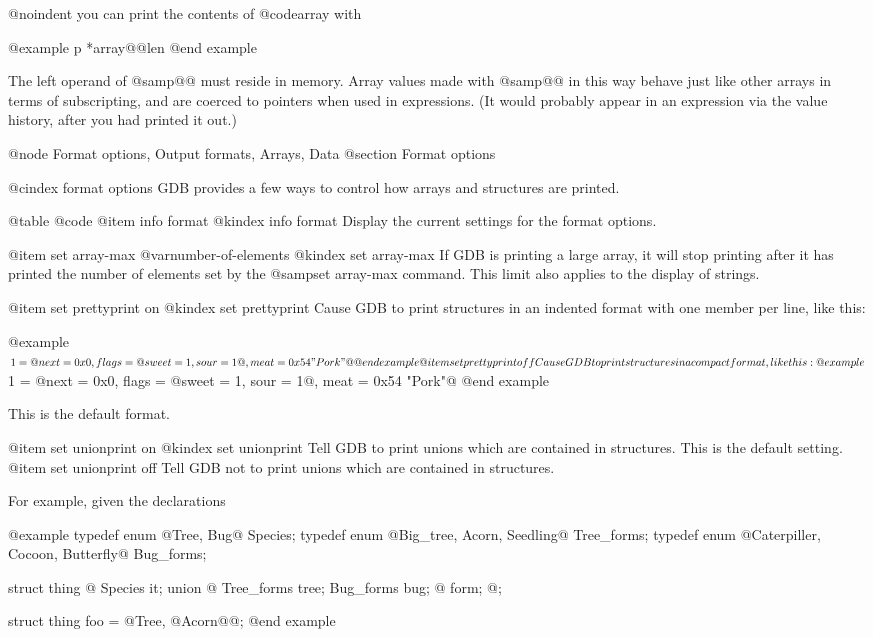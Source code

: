 @noindent
you can print the contents of @code{array} with

@example
p *array@@len
@end example

The left operand of @samp{@@} must reside in memory.  Array values made
with @samp{@@} in this way behave just like other arrays in terms of
subscripting, and are coerced to pointers when used in expressions.
(It would probably appear in an expression via the value history,
after you had printed it out.)

@node Format options, Output formats, Arrays, Data
@section Format options

@cindex format options
GDB provides a few ways to control how arrays and structures are
printed.  

@table @code
@item info format
@kindex info format
Display the current settings for the format options.

@item set array-max @var{number-of-elements}
@kindex set array-max
If GDB is printing a large array, it will stop printing after it has
printed the number of elements set by the @samp{set array-max} command.
This limit also applies to the display of strings.

@item set prettyprint on
@kindex set prettyprint
Cause GDB to print structures in an indented format with one member per
line, like this:

@example
$1 = @{
  next = 0x0,
  flags = @{
    sweet = 1,
    sour = 1
  @},
  meat = 0x54 "Pork"
@}
@end example

@item set prettyprint off
Cause GDB to print structures in a compact format, like this:

@example
$1 = @{next = 0x0, flags = @{sweet = 1, sour = 1@}, 
meat = 0x54 "Pork"@}
@end example

This is the default format.

@item set unionprint on
@kindex set unionprint
Tell GDB to print unions which are contained in structures.  This is the
default setting.
@item set unionprint off
Tell GDB not to print unions which are contained in structures.

For example, given the declarations

@example
typedef enum @{Tree, Bug@} Species;
typedef enum @{Big_tree, Acorn, Seedling@} Tree_forms;
typedef enum @{Caterpiller, Cocoon, Butterfly@} Bug_forms;

struct thing @{
  Species it;
  union @{
    Tree_forms tree;
    Bug_forms bug;
  @} form;
@};

struct thing foo = @{Tree, @{Acorn@}@};
@end example

